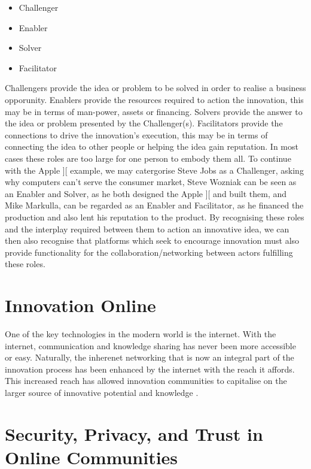 \begin{itemize}
	\item Challenger
	\item Enabler
	\item Solver
	\item Facilitator
\end{itemize}

Challengers provide the idea or problem to be solved in order to realise a business opporunity. Enablers provide the resources required to action the innovation, this may be in terms of man-power, assets or financing. Solvers provide the answer to the idea or problem presented by the Challenger(s). Facilitators provide the connections to drive the innovation's execution, this may be in terms of connecting the idea to other people or helping the idea gain reputation. In most cases these roles are too large for one person to embody them all. To continue with the Apple ][ example, we may catergorise Steve Jobs as a Challenger, asking why computers can't serve the consumer market, Steve Wozniak can be seen as an Enabler and Solver, as he both designed the Apple ][ and built them, and Mike Markulla, can be regarded as an Enabler and Facilitator, as he financed the production and also lent his reputation to the product. By recognising these roles and the interplay required between them to action an innovative idea, we can then also recognise that platforms which seek to encourage innovation must also provide functionality for the collaboration/networking between actors fulfilling these roles.

\section{Innovation Online}
One of the key technologies in the modern world is the internet. With the internet, communication and knowledge sharing has never been more accessible or easy. Naturally, the inherenet networking that is now an integral part of the innovation process has been enhanced by the internet with the reach it affords. This increased reach has allowed innovation communities to capitalise on the larger source of innovative potential and knowledge \cite{hautz2010establish}.

\section{Security, Privacy, and Trust in Online Communities}


